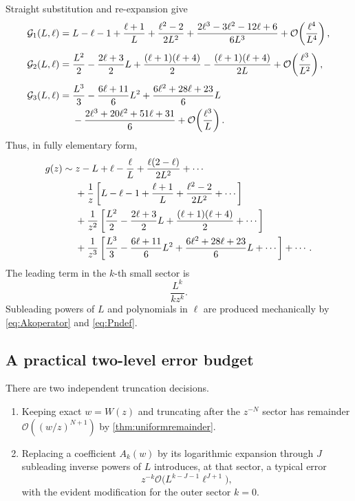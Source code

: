 \documentclass[11pt]{article}
\theoremstyle{clean}
\newcommand{\bigO}{\mathcal O}
\begin{document}
Straight substitution and re-expansion give
\begin{align}
\mathcal G_1(L,\ell)={}&
 L-\ell-1+\frac{\ell+1}{L}
 +\frac{\ell^2-2}{2L^2}
 +\frac{2\ell^3-3\ell^2-12\ell+6}{6L^3}
 +\bigO\!\left(\frac{\ell^4}{L^4}\right),
 \label{eq:G1exp}\\[0.4em]
\mathcal G_2(L,\ell)={}&
 \frac{L^2}{2}-\frac{2\ell+3}{2}L
 +\frac{(\ell+1)(\ell+4)}2
 -\frac{(\ell+1)(\ell+4)}{2L}
 +\bigO\!\left(\frac{\ell^3}{L^2}\right),
 \label{eq:G2exp}\\[0.4em]
\mathcal G_3(L,\ell)={}&
 \frac{L^3}{3}-\frac{6\ell+11}{6}L^2
 +\frac{6\ell^2+28\ell+23}{6}L\notag\\
 &-\frac{2\ell^3+20\ell^2+51\ell+31}{6}
 +\bigO\!\left(\frac{\ell^3}{L}\right).
 \label{eq:G3exp}
\end{align}
Thus, in fully elementary form,
\begin{align}
 g(z)\sim{}&z-L+\ell-\frac{\ell}{L}
 +\frac{\ell(2-\ell)}{2L^2}+\cdots\notag\\
 &+\frac1z\left[
 L-\ell-1+\frac{\ell+1}{L}
 +\frac{\ell^2-2}{2L^2}+\cdots\right]\notag\\
 &+\frac1{z^2}\left[
 \frac{L^2}{2}-\frac{2\ell+3}{2}L
 +\frac{(\ell+1)(\ell+4)}2+\cdots\right]\notag\\
 &+\frac1{z^3}\left[
 \frac{L^3}{3}-\frac{6\ell+11}{6}L^2
 +\frac{6\ell^2+28\ell+23}{6}L+\cdots\right]+\cdots.
 \label{eq:fullfirstsectors}
\end{align}
The leading term in the \(k\)-th small sector is
\begin{equation}\label{eq:sectorleading}
  \frac{L^k}{kz^k}.
\end{equation}
Subleading powers of \(L\) and polynomials in \(\ell\) are produced
mechanically by \cref{eq:Akoperator} and \cref{eq:Pndef}.

\subsection{A practical two-level error budget}

There are two independent truncation decisions.

\begin{enumerate}[label=(\alph*),leftmargin=2em]
\item Keeping exact \(w=W(z)\) and truncating after the \(z^{-N}\) sector has
remainder \(\bigO((w/z)^{N+1})\) by \cref{thm:uniformremainder}.

\item Replacing a coefficient \(A_k(w)\) by its logarithmic expansion through
\(J\) subleading inverse powers of \(L\) introduces, at that sector, a typical
error
\[
  z^{-k}\bigO\bigl(L^{k-J-1}\ell^{J+1}\bigr),
\]
with the evident modification for the outer sector \(k=0\).
\end{enumerate}
\end{document}
